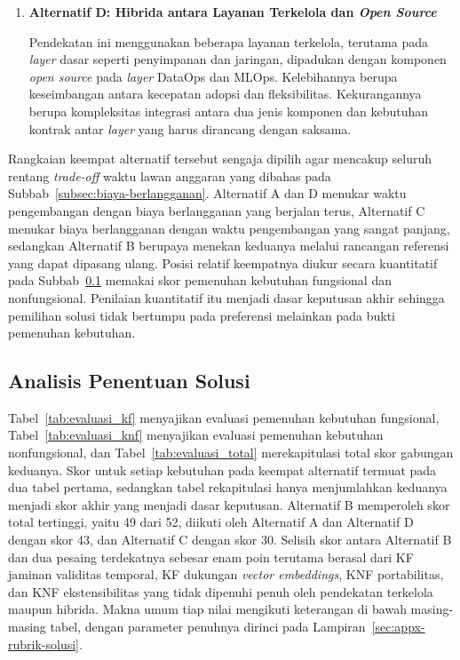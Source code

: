 \begin{enumerate}
    \vspace{0.5em}

    \item \textbf{Alternatif D: Hibrida antara Layanan Terkelola dan \textit{Open Source}}

    Pendekatan ini menggunakan beberapa layanan terkelola, terutama pada \textit{layer} dasar seperti penyimpanan dan jaringan, dipadukan dengan komponen \textit{open source} pada \textit{layer} DataOps dan MLOps. Kelebihannya berupa keseimbangan antara kecepatan adopsi dan fleksibilitas. Kekurangannya berupa kompleksitas integrasi antara dua jenis komponen dan kebutuhan kontrak antar \textit{layer} yang harus dirancang dengan saksama.
\end{enumerate}

Rangkaian keempat alternatif tersebut sengaja dipilih agar mencakup seluruh rentang \textit{trade-off} waktu lawan anggaran yang dibahas pada Subbab~\ref{subsec:biaya-berlangganan}. Alternatif A dan D menukar waktu pengembangan dengan biaya berlangganan yang berjalan terus, Alternatif C menukar biaya berlangganan dengan waktu pengembangan yang sangat panjang, sedangkan Alternatif B berupaya menekan keduanya melalui rancangan referensi yang dapat dipasang ulang. Posisi relatif keempatnya diukur secara kuantitatif pada Subbab~\ref{subsec:penentuan-solusi} memakai skor pemenuhan kebutuhan fungsional dan nonfungsional. Penilaian kuantitatif itu menjadi dasar keputusan akhir sehingga pemilihan solusi tidak bertumpu pada preferensi melainkan pada bukti pemenuhan kebutuhan.

\subsection{Analisis Penentuan Solusi}
\label{subsec:penentuan-solusi}

Tabel~\ref{tab:evaluasi_kf} menyajikan evaluasi pemenuhan kebutuhan fungsional, Tabel~\ref{tab:evaluasi_knf} menyajikan evaluasi pemenuhan kebutuhan nonfungsional, dan Tabel~\ref{tab:evaluasi_total} merekapitulasi total skor gabungan keduanya. Skor untuk setiap kebutuhan pada keempat alternatif termuat pada dua tabel pertama, sedangkan tabel rekapitulasi hanya menjumlahkan keduanya menjadi skor akhir yang menjadi dasar keputusan. Alternatif B memperoleh skor total tertinggi, yaitu 49 dari 52, diikuti oleh Alternatif A dan Alternatif D dengan skor 43, dan Alternatif C dengan skor 30. Selisih skor antara Alternatif B dan dua pesaing terdekatnya sebesar enam poin terutama berasal dari KF jaminan validitas temporal, KF dukungan \textit{vector embeddings}, KNF portabilitas, dan KNF ekstensibilitas yang tidak dipenuhi penuh oleh pendekatan terkelola maupun hibrida. Makna umum tiap nilai mengikuti keterangan di bawah masing-masing tabel, dengan parameter penuhnya dirinci pada Lampiran~\ref{sec:appx-rubrik-solusi}.

